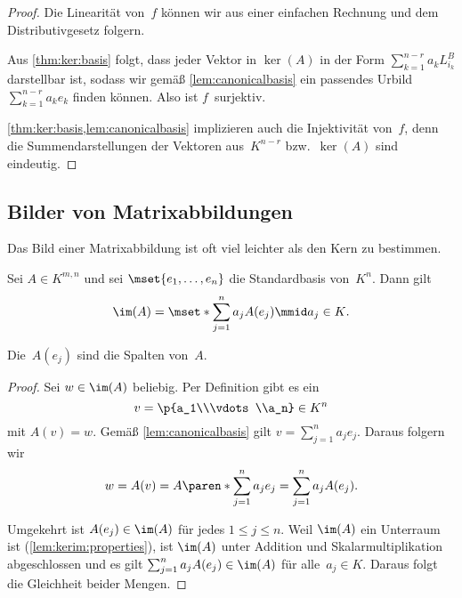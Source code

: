 \documentclass[a4paper]{article}
\begin{document}
\begin{proof}
    Die Linearität von~$f$ können wir aus einer einfachen Rechnung und dem Distributivgesetz folgern.

    Aus \cref{thm:ker:basis} folgt, dass jeder Vektor in $\ker(A)$ in der Form $\sum_{k=1}^{n-r} a_kL_{i_k}^B$ darstellbar ist, sodass wir gemäß \cref{lem:canonicalbasis} ein passendes Urbild $\sum_{k=1}^{n-r} a_ke_k$ finden können. Also ist $f$~surjektiv.

    \cref{thm:ker:basis,lem:canonicalbasis} implizieren auch die Injektivität von~$f$, denn die Summendarstellungen der Vektoren aus~$K^{n-r}$ bzw.\ $\ker(A)$ sind eindeutig.
\end{proof}

\subsection{Bilder von Matrixabbildungen}

Das Bild einer Matrixabbildung ist oft viel leichter als den Kern zu bestimmen.

\begin{lemma}\label{lem:im:naive}
    Sei $A \in K^{m,n}$ und sei $\mset{e_1,\dots,e_n}$ die Standardbasis von~$K^n$. Dann gilt
    \begin{equation*}
        \im(A) = \mset*{\sum_{j=1}^n a_jA(e_j) \mmid a_j \in K}.
    \end{equation*}
\end{lemma}

Die~$A(e_j)$ sind die Spalten von~$A$.

\begin{proof}
    Sei $w \in \im(A)$ beliebig. Per Definition gibt es ein
    \begin{equation*}
        v = \p{a_1\\\vdots\\a_n} \in K^n
    \end{equation*}
    mit $A(v) = w$. Gemäß \cref{lem:canonicalbasis} gilt $v = \sum_{j=1}^n a_je_j$. Daraus folgern wir
    \begin{equation*}
        w = A(v) = A\paren*{\sum_{j=1}^n a_je_j} = \sum_{j=1}^n a_jA(e_j).
    \end{equation*}

    Umgekehrt ist $A(e_j) \in \im(A)$ für jedes $1 \leq j \leq n$. Weil $\im(A)$ ein Unterraum ist (\cref{lem:kerim:properties}), ist $\im(A)$ unter Addition und Skalarmultiplikation abgeschlossen und es gilt $\sum_{j=1}^n a_jA(e_j) \in \im(A)$ für alle~$a_j \in K$. Daraus folgt die Gleichheit beider Mengen.
\end{proof}
\end{document}
